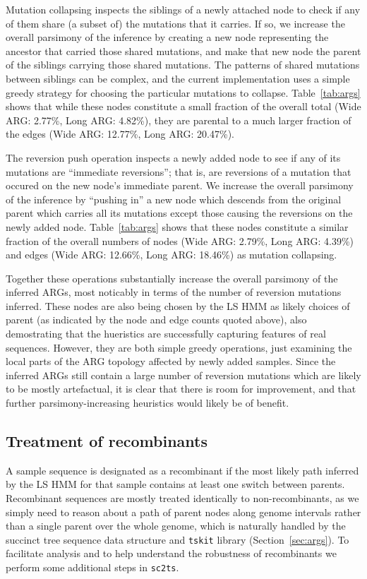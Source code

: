 \documentclass{article}
\begin{document}
Mutation collapsing inspects the siblings of a newly attached node
to check if any of them share (a subset of) the mutations that
it carries. If so, we increase the overall parsimony of the inference
by creating a new node representing the ancestor that carried
those shared mutations, and make that new node the parent of the
siblings carrying those shared mutations. The patterns of
shared mutations between siblings can be complex, and the current
implementation uses a simple greedy strategy for choosing
the particular mutations to collapse.
Table~\ref{tab:args} shows that
while these nodes constitute a small fraction of the
overall total (Wide ARG: 2.77\%, Long ARG: 4.82\%),
they are parental to a much larger fraction of the
edges (Wide ARG: 12.77\%, Long ARG: 20.47\%).

The reversion push operation inspects a newly added node to see
if any of its mutations are ``immediate reversions''; that is,
are reversions of a mutation that occured on the new node's
immediate parent. We increase the overall parsimony of the
inference by ``pushing in'' a new node which descends from the
original parent which carries all its mutations except those
causing the reversions on the newly added node.
Table~\ref{tab:args} shows that
these nodes constitute a similar fraction of the
overall numbers of nodes (Wide ARG: 2.79\%, Long ARG: 4.39\%)
and edges (Wide ARG: 12.66\%, Long ARG: 18.46\%)
as mutation collapsing.

Together these operations substantially increase the overall parsimony
of the inferred ARGs, most noticably in terms of the number of
reversion mutations inferred. These nodes are also being chosen by the
LS HMM as likely choices of parent (as indicated by the node and edge
counts quoted above), also demostrating that the hueristics are successfully
capturing features of real sequences.
However, they are both simple
greedy operations, just examining the local parts of the
ARG topology affected by newly added samples. Since the inferred
ARGs still contain a large number of reversion mutations which
are likely to be mostly artefactual, it is clear that there
is room for improvement, and that further parsimony-increasing
heuristics would likely be of benefit.

\subsection{Treatment of recombinants}
\label{sec:treatment_recombinants}
A sample sequence is designated as a recombinant if the most likely
path inferred by the LS HMM for that sample contains at least
one switch between parents. Recombinant sequences are mostly treated
identically to non-recombinants, as we simply need to reason about
a path of parent nodes along genome intervals rather than a
single parent over the whole genome, which is naturally handled by
the succinct tree sequence data structure and \texttt{tskit} library
(Section~\ref{sec:args}). To facilitate
analysis and to help understand the robustness of recombinants
we perform some additional steps in \texttt{sc2ts}.
\end{document}
